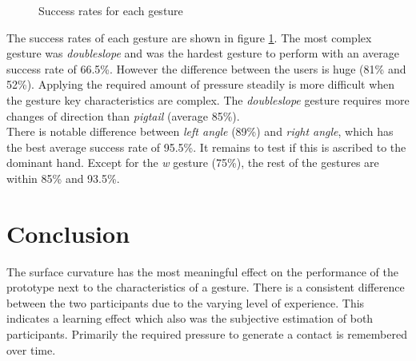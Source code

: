 \begin{center}
\begin{figure}
\caption{Success rates for each gesture}
\label{fig:gestures}
\end{figure}
\end{center}
The success rates of each gesture are shown in figure \ref{fig:gestures}. The most complex gesture was \emph{doubleslope} and was the hardest gesture to perform with an average success rate of 66.5\%. However the difference between the users is huge (81\% and 52\%). Applying the required amount of pressure steadily is more difficult when the gesture key characteristics are complex. The \emph{doubleslope} gesture requires more changes of direction than \emph{pigtail} (average 85\%).
\\
There is notable difference between \emph{left angle} (89\%) and \emph{right angle}, which has the best  average success rate of 95.5\%. It remains to test if this is ascribed to the dominant hand. Except for the \emph{w} gesture (75\%), the rest of the gestures are within 85\% and 93.5\%. 

\section{Conclusion}
The surface curvature has the most meaningful effect on the performance of the prototype next to the characteristics of a gesture. There is a consistent difference between the two participants due to the varying level of experience. This indicates a learning effect which also was the subjective estimation of both participants. Primarily the required pressure to generate a contact is remembered over time. 